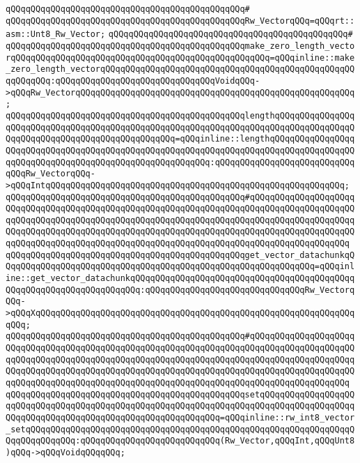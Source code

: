 \verb|qQQqqQQqqQQqqQQqqQQqqQQqqQQqqQQqqQQqqQQqqQQqqQQq#|\newline
\verb|qQQqqQQqqQQqqQQqqQQqqQQqqQQqqQQqqQQqqQQqqQQqqQQqRw_VectorqQQq=qQQqrt::asm::Unt8_Rw_Vector;|\newline
\verb|qQQqqQQqqQQqqQQqqQQqqQQqqQQqqQQqqQQqqQQqqQQqqQQq#|\newline
\verb|qQQqqQQqqQQqqQQqqQQqqQQqqQQqqQQqqQQqqQQqqQQqqQQqmake_zero_length_vectorqQQqqQQqqQQqqQQqqQQqqQQqqQQqqQQqqQQqqQQqqQQqqQQqqQQq=qQQqinline::make_zero_length_vectorqQQqqQQqqQQqqQQqqQQqqQQqqQQqqQQqqQQqqQQqqQQqqQQqqQQqqQQqqQQq:qQQqqQQqqQQqqQQqqQQqqQQqqQQqqQQqVoidqQQq->qQQqRw_VectorqQQqqQQqqQQqqQQqqQQqqQQqqQQqqQQqqQQqqQQqqQQqqQQqqQQqqQQq;|\newline
\verb|qQQqqQQqqQQqqQQqqQQqqQQqqQQqqQQqqQQqqQQqqQQqqQQqlengthqQQqqQQqqQQqqQQqqQQqqQQqqQQqqQQqqQQqqQQqqQQqqQQqqQQqqQQqqQQqqQQqqQQqqQQqqQQqqQQqqQQqqQQqqQQqqQQqqQQqqQQqqQQqqQQqqQQqqQQq=qQQqinline::lengthqQQqqQQqqQQqqQQqqQQqqQQqqQQqqQQqqQQqqQQqqQQqqQQqqQQqqQQqqQQqqQQqqQQqqQQqqQQqqQQqqQQqqQQqqQQqqQQqqQQqqQQqqQQqqQQqqQQqqQQqqQQqqQQq:qQQqqQQqqQQqqQQqqQQqqQQqqQQqqQQqRw_VectorqQQq->qQQqIntqQQqqQQqqQQqqQQqqQQqqQQqqQQqqQQqqQQqqQQqqQQqqQQqqQQqqQQqqQQq;|\newline
\verb|qQQqqQQqqQQqqQQqqQQqqQQqqQQqqQQqqQQqqQQqqQQqqQQq#qQQqqQQqqQQqqQQqqQQqqQQqqQQqqQQqqQQqqQQqqQQqqQQqqQQqqQQqqQQqqQQqqQQqqQQqqQQqqQQqqQQqqQQqqQQqqQQqqQQqqQQqqQQqqQQqqQQqqQQqqQQqqQQqqQQqqQQqqQQqqQQqqQQqqQQqqQQqqQQqqQQqqQQqqQQqqQQqqQQqqQQqqQQqqQQqqQQqqQQqqQQqqQQqqQQqqQQqqQQqqQQqqQQqqQQqqQQqqQQqqQQqqQQqqQQqqQQqqQQqqQQqqQQqqQQqqQQqqQQqqQQqqQQqqQQqqQQqqQQq|\newline
\verb|qQQqqQQqqQQqqQQqqQQqqQQqqQQqqQQqqQQqqQQqqQQqqQQqget_vector_datachunkqQQqqQQqqQQqqQQqqQQqqQQqqQQqqQQqqQQqqQQqqQQqqQQqqQQqqQQqqQQqqQQq=qQQqinline::get_vector_datachunkqQQqqQQqqQQqqQQqqQQqqQQqqQQqqQQqqQQqqQQqqQQqqQQqqQQqqQQqqQQqqQQqqQQqqQQq:qQQqqQQqqQQqqQQqqQQqqQQqqQQqqQQqRw_VectorqQQq->qQQqXqQQqqQQqqQQqqQQqqQQqqQQqqQQqqQQqqQQqqQQqqQQqqQQqqQQqqQQqqQQqqQQqqQQq;|\newline
\verb|qQQqqQQqqQQqqQQqqQQqqQQqqQQqqQQqqQQqqQQqqQQqqQQq#qQQqqQQqqQQqqQQqqQQqqQQqqQQqqQQqqQQqqQQqqQQqqQQqqQQqqQQqqQQqqQQqqQQqqQQqqQQqqQQqqQQqqQQqqQQqqQQqqQQqqQQqqQQqqQQqqQQqqQQqqQQqqQQqqQQqqQQqqQQqqQQqqQQqqQQqqQQqqQQqqQQqqQQqqQQqqQQqqQQqqQQqqQQqqQQqqQQqqQQqqQQqqQQqqQQqqQQqqQQqqQQqqQQqqQQqqQQqqQQqqQQqqQQqqQQqqQQqqQQqqQQqqQQqqQQqqQQqqQQqqQQqqQQqqQQqqQQqqQQq|\newline
\verb|qQQqqQQqqQQqqQQqqQQqqQQqqQQqqQQqqQQqqQQqqQQqqQQqsetqQQqqQQqqQQqqQQqqQQqqQQqqQQqqQQqqQQqqQQqqQQqqQQqqQQqqQQqqQQqqQQqqQQqqQQqqQQqqQQqqQQqqQQqqQQqqQQqqQQqqQQqqQQqqQQqqQQqqQQqqQQqqQQqqQQq=qQQqinline::rw_int8_vector_setqQQqqQQqqQQqqQQqqQQqqQQqqQQqqQQqqQQqqQQqqQQqqQQqqQQqqQQqqQQqqQQqqQQqqQQqqQQqqQQq:qQQqqQQqqQQqqQQqqQQqqQQqqQQq(Rw_Vector,qQQqInt,qQQqUnt8)qQQq->qQQqVoidqQQqqQQq;|\newline
